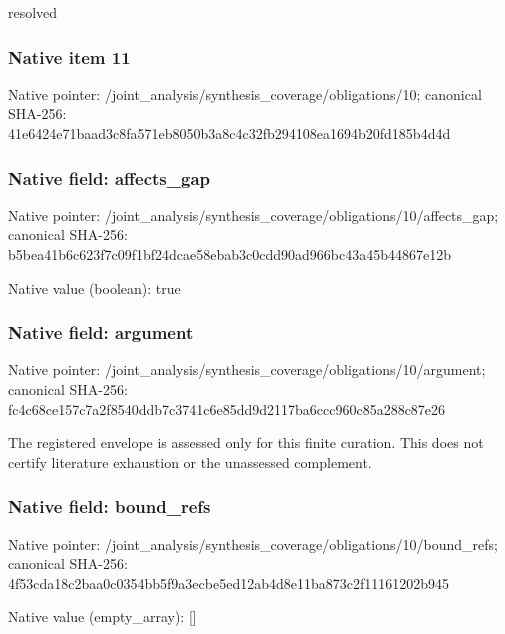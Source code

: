 \documentclass[10pt,a4paper]{article}
\begin{document}
resolved


\subsubsection{Native item 11}


Native pointer: /joint\_analysis/synthesi\allowbreak{}s\_coverage/obligations/1\allowbreak{}0; canonical SHA-256: 41e6424e71baad3c8fa571eb\allowbreak{}8050b3a8c4c32fb294108ea1\allowbreak{}694b20fd185b4d4d



\subsubsection{Native field: affects\_gap}


Native pointer: /joint\_analysis/synthesi\allowbreak{}s\_coverage/obligations/1\allowbreak{}0/affects\_gap; canonical SHA-256: b5bea41b6c623f7c09f1bf24\allowbreak{}dcae58ebab3c0cdd90ad966b\allowbreak{}c43a45b44867e12b



Native value (boolean): true



\subsubsection{Native field: argument}


Native pointer: /joint\_analysis/synthesi\allowbreak{}s\_coverage/obligations/1\allowbreak{}0/argument; canonical SHA-256: fc4c68ce157c7a2f8540ddb7\allowbreak{}c3741c6e85dd9d2117ba6ccc\allowbreak{}960c85a288c87e26


The registered envelope is assessed only for this finite curation. This does not certify literature exhaustion or the unassessed complement.


\subsubsection{Native field: bound\_refs}


Native pointer: /joint\_analysis/synthesi\allowbreak{}s\_coverage/obligations/1\allowbreak{}0/bound\_refs; canonical SHA-256: 4f53cda18c2baa0c0354bb5f\allowbreak{}9a3ecbe5ed12ab4d8e11ba87\allowbreak{}3c2f11161202b945



Native value (empty\_array): []
\end{document}
